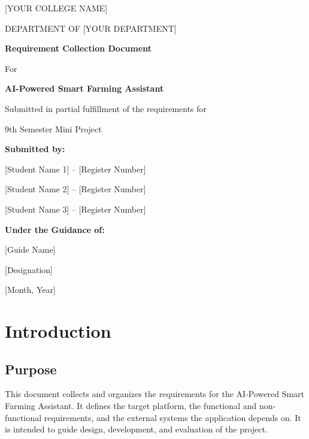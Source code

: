 \documentclass[12pt,a4paper]{article}
\begin{document}
\begin{titlepage}
    \centering
    \vspace*{1cm}
    {\large [YOUR COLLEGE NAME]\par}
    {\large DEPARTMENT OF [YOUR DEPARTMENT]\par}
    \vspace{2cm}
    {\Huge\bfseries Requirement Collection Document\par}
    \vspace{0.5cm}
    {\Large For\par}
    \vspace{0.5cm}
    {\Large\bfseries AI-Powered Smart Farming Assistant\par}
    \vspace{2cm}
    {\large Submitted in partial fulfillment of the requirements for\par}
    {\large 9th Semester Mini Project\par}
    \vspace{2cm}
    {\large\bfseries Submitted by:\par}
    \vspace{0.3cm}
    {\large [Student Name 1] -- [Register Number]\par}
    {\large [Student Name 2] -- [Register Number]\par}
    {\large [Student Name 3] -- [Register Number]\par}
    \vspace{2cm}
    {\large\bfseries Under the Guidance of:\par}
    \vspace{0.3cm}
    {\large [Guide Name]\par}
    {\large [Designation]\par}
    \vfill
    {\large [Month, Year]\par}
\end{titlepage}

\tableofcontents
\newpage

\section{Introduction}

\subsection{Purpose}
This document collects and organizes the requirements for the AI-Powered Smart Farming Assistant. It defines the target platform, the functional and non-functional requirements, and the external systems the application depends on. It is intended to guide design, development, and evaluation of the project.
\end{document}
